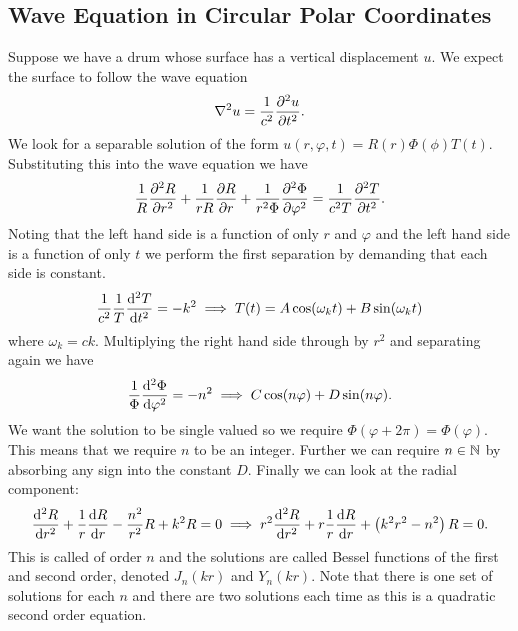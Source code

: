\documentclass[a4paper]{article}
\begin{document}
    \subsection{Wave Equation in Circular Polar Coordinates}
    Suppose we have a drum whose surface has a vertical displacement \(u\).
    We expect the surface to follow the wave equation
    \[\nabla^2 u = \frac{1}{c^2}\pdv[2]{u}{t}.\]
    We look for a separable solution of the form \(u(r, \varphi, t) = R(r)\Phi(\phi)T(t)\).
    Substituting this into the wave equation we have
    \[\frac{1}{R}\pdv[2]{R}{r} + \frac{1}{rR}\pdv{R}{r} + \frac{1}{r^2\Phi}\pdv[2]{\Phi}{\varphi} = \frac{1}{c^2T}\pdv[2]{T}{t}.\]
    Noting that the left hand side is a function of only \(r\) and \(\varphi\) and the left hand side is a function of only \(t\) we perform the first separation by demanding that each side is constant.
    \[\frac{1}{c^2}\frac{1}{T}\dv[2]{T}{t} = -k^2 \implies T(t) = A\cos(\omega_k t) + B\sin(\omega_k t)\]
    where \(\omega_k = ck\).
    Multiplying the right hand side through by \(r^2\) and separating again we have
    \[\frac{1}{\Phi}\dv[2]{\Phi}{\varphi} = -n^2 \implies C\cos(n\varphi) + D\sin(n\varphi).\]
    We want the solution to be single valued so we require \(\Phi(\varphi+ 2\pi) = \Phi(\varphi)\).
    This means that we require \(n\) to be an integer.
    Further we can require \(n\in\mathbb{N}\) by absorbing any sign into the constant \(D\).
    Finally we can look at the radial component:
    \[\dv[2]{R}{r} + \frac{1}{r}\dv{R}{r} - \frac{n^2}{r^2}R + k^2R = 0 \implies r^2\dv[2]{R}{r} + r\frac{1}{r}\dv{R}{r} + \left(k^2r^2 - n^2\right)R = 0.\]
    This is called  of order \(n\) and the solutions are called Bessel functions of the first and second order, denoted \(J_n(kr)\) and \(Y_n(kr)\).
    Note that there is one set of solutions for each \(n\) and there are two solutions each time as this is a quadratic second order equation.
    
\end{document}
